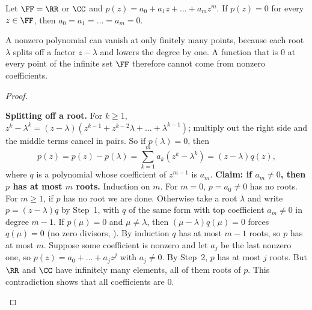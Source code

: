 \documentclass[10pt]{scrartcl}
\begin{document}
\begin{proposition*}
  Let $\FF=\RR$ or $\CC$ and $p(z)=a_0+a_1z+\dots+a_mz^m$. If $p(z)=0$ for every $z\in\FF$, then $a_0=a_1=\dots=a_m=0$.
\end{proposition*}
\begin{ideabox}
  A nonzero polynomial can vanish at only finitely many points, because each root $\lambda$ splits off a factor $z-\lambda$ and lowers the degree by one. A function that is $0$ at every point of the infinite set $\FF$ therefore cannot come from nonzero coefficients.
\end{ideabox}
\begin{proof}
  \begin{steps}
    \ii \textbf{Splitting off a root.} For $k\ge1$, $z^k-\lambda^k=(z-\lambda)(z^{k-1}+z^{k-2}\lambda+\dots+\lambda^{k-1})$; multiply out the right side and the middle terms cancel in pairs. So if $p(\lambda)=0$, then
    \[
      p(z)=p(z)-p(\lambda)=\sum_{k=1}^m a_k(z^k-\lambda^k)=(z-\lambda)q(z),
    \]
    where $q$ is a polynomial whose coefficient of $z^{m-1}$ is $a_m$.
    \ii \textbf{Claim: if $a_m\ne0$, then $p$ has at most $m$ roots.} Induction on $m$. For $m=0$, $p=a_0\ne0$ has no roots. For $m\ge1$, if $p$ has no root we are done. Otherwise take a root $\lambda$ and write $p=(z-\lambda)q$ by Step~1, with $q$ of the same form with top coefficient $a_m\ne0$ in degree $m-1$. If $p(\mu)=0$ and $\mu\ne\lambda$, then $(\mu-\lambda)q(\mu)=0$ forces $q(\mu)=0$ (no zero divisors, ). By induction $q$ has at most $m-1$ roots, so $p$ has at most $m$.
    \ii Suppose some coefficient is nonzero and let $a_j$ be the last nonzero one, so $p(z)=a_0+\dots+a_jz^j$ with $a_j\ne0$. By Step~2, $p$ has at most $j$ roots. But $\RR$ and $\CC$ have infinitely many elements, all of them roots of $p$. This contradiction shows that all coefficients are $0$.
  \end{steps}
\end{proof}
\end{document}
